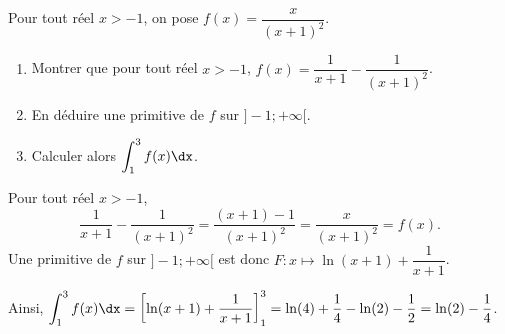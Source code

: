 \documentclass[11pt,fleqn, openany]{book} %
\begin{document}
 
  
 \begin{exercise}
Pour tout réel $x> -1$, on pose $f(x)=\dfrac{x}{(x+1)^2}$.

\begin{enumerate}
\item Montrer que pour tout réel $x>-1$, $f(x)=\dfrac{1}{x+1}-\dfrac{1}{(x+1)^2}$.
\item En déduire une primitive de $f$ sur $]-1;+\infty[$.
\item Calculer alors $\displaystyle\int_{1}^3 f(x)\dx$.
\end{enumerate}\end{exercise}


\begin{solution}
Pour tout réel \(x>-1\), 
\[\dfrac{1}{x+1}-\dfrac{1}{(x+1)^2}=\dfrac{(x+1)-1}{(x+1)^2}=\dfrac{x}{(x+1)^2}=f(x).\]
Une primitive de \(f\) sur \(]-1;+\infty[\) est donc \(F:x\mapsto \ln(x+1)+\dfrac{1}{x+1}\).

Ainsi, \(\displaystyle\int_{1}^3 f(x)\dx = \left[ \ln(x+1)+\dfrac{1}{x+1} \right]_1^3=\ln(4)+\dfrac{1}{4}-\ln(2)-\dfrac{1}{2}=\ln(2)-\dfrac{1}{4}\).
\end{solution}
\end{document}
